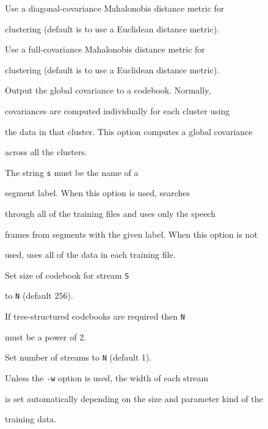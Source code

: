 \begin{optlist}


    Use a diagonal-covariance Mahalonobis distance metric for


 clustering (default is to use a Euclidean distance metric).





    Use a full-covariance Mahalonobis distance metric for


 clustering (default is to use a Euclidean distance metric).





    Output the global covariance to a codebook.  Normally,


     covariances are computed individually for each cluster using


     the data in that cluster.  This option computes a global covariance


     across all the clusters.





   The string {\tt s} must be the name of a


      segment label.  When this option is used,  searches


      through all of the training files and uses only the speech


      frames from segments with the given label.  When this option is not 


      used,  uses all of the data in each training file.





   Set size of codebook for stream \texttt{S} 


       to \texttt{N} (default 256).


   If tree-structured codebooks are required then \texttt{N} 


   must be a power of 2.


  


   Set number of streams to \texttt{N} (default 1).


    Unless the \texttt{-w} option is used, the width of each stream


    is set automatically depending on the size and parameter kind of the 


    training data.






\end{optlist}

